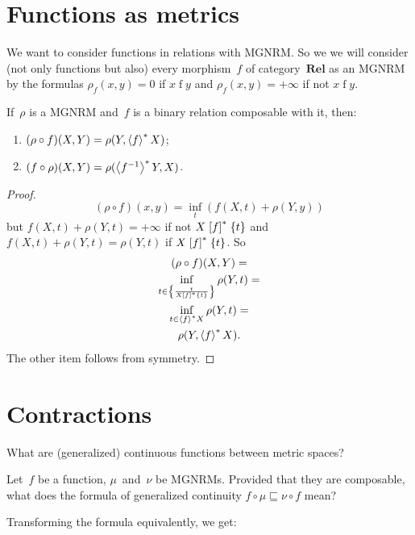 
\section{Functions as metrics}

We want to consider functions in relations with MGNRM. So we we will consider (not only functions but also) every morphism~$f$ of category~$\mathbf{Rel}$ as an MGNRM by the formulas $\rho_{f}(x,y) = 0$ if $x\mathrel{f}y$ and $\rho_{f}(x,y) = +\infty$ if not $x\mathrel{f}y$.

\begin{thm}
If~$\rho$ is a MGNRM and~$f$ is a binary relation composable with it, then:
\begin{enumerate}
\item $(\rho\circ f)(X,Y) = \rho(Y,\left\langle f\right\rangle ^{\ast}X)$;
\item $(f\circ\rho)(X,Y) = \rho(\left\langle f^{-1}\right\rangle ^{\ast}Y,X)$.
\end{enumerate}
\end{thm}

\begin{proof}
~
\[
(\rho\circ f)(x,y) = \inf_{t}(f(X,t) + \rho(Y,y))
\]
but $f(X,t) + \rho(Y,t) = +\infty$ if not $X\mathrel{\left[f\right]^{\ast}}\{t\}$ and $f(X,t) + \rho(Y,t) = \rho(Y,t)$ if $X\mathrel{\left[f\right]^{\ast}}\{t\}$. So
\begin{multline*}
(\rho\circ f)(X,Y) = \\
\inf_{t\in\left\{ \frac{t}{X\mathrel{\left[f\right]^{\ast}}\{t\}}\right\}}\rho(Y,t) = \\
\inf_{t\in\left\langle f\right\rangle ^{\ast}X}\rho(Y,t) = \\
\rho(Y,\left\langle f\right\rangle ^{\ast}X).
\end{multline*}
The other item follows from symmetry.
\end{proof}
    
\section{Contractions}

What are (generalized) continuous functions between metric spaces?

Let~$f$ be a function, $\mu$~and~$\nu$ be MGNRMs. Provided that they are composable, what does the formula of generalized continuity $f\circ\mu\sqsubseteq\nu\circ f$ mean?

Transforming the formula equivalently, we get:

